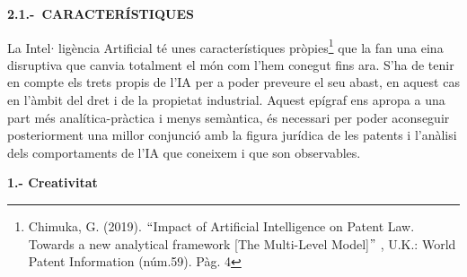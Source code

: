 \documentclass[12pt]{article}
\renewcommand{\_}{\kern-1.5pt\textunderscore\kern-1.5pt}
\begin{document}
\begin{itemize}
\vspace{\baselineskip}
\begin{justify}
\textbf{2.1.-\  CARACTERÍSTIQUES}
\end{justify}\par


\vspace{\baselineskip}
\begin{justify}
La Intel$ \cdot $ ligència Artificial té unes característiques pròpies\footnote{ Chimuka, G. (2019). $``$Impact of Artificial Intelligence on Patent Law. Towards a new analytical framework [The Multi-Level Model]$"$ , U.K.: World Patent Information (núm.59). Pàg. 4 } que la fan una eina disruptiva que canvia totalment el món com l’hem conegut fins ara. S’ha de tenir en compte els trets propis de l’IA per a poder preveure el seu abast, en aquest cas en l’àmbit del dret i de la propietat industrial. Aquest epígraf ens apropa a una part més analítica-pràctica i menys semàntica, és necessari per poder aconseguir posteriorment una millor conjunció amb la figura jurídica de les patents i l’anàlisi dels comportaments de l’IA que coneixem i que son observables. 
\end{justify}\par


\vspace{\baselineskip}
\textbf{1.- Creativitat}\par



\end{itemize}
\end{document}
